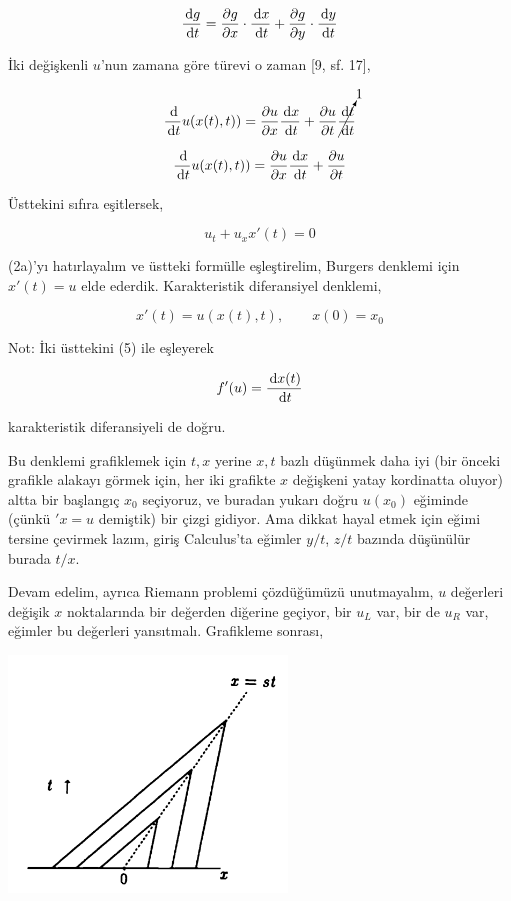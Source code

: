 \documentclass[12pt,fleqn]{article}\usepackage{../../common}
\begin{document}
$$
\frac{\,\mathrm{d} g}{\,\mathrm{d} t} =
\frac{\partial g}{\partial x} \cdot \frac{\,\mathrm{d} x}{\,\mathrm{d} t} +
\frac{\partial g}{\partial y} \cdot \frac{\,\mathrm{d} y}{\,\mathrm{d} t} 
$$

İki değişkenli $u$'nun zamana göre türevi o zaman [9, sf. 17],

$$
\frac{\,\mathrm{d}}{\,\mathrm{d} t} u (x(t),t)) =
\frac{\partial u}{\partial x} \frac{\,\mathrm{d} x}{\,\mathrm{d} t} +
\frac{\partial u}{\partial t} \cancelto{1}{\frac{\,\mathrm{d} t}{\,\mathrm{d} t}}
$$

$$
\frac{\,\mathrm{d}}{\,\mathrm{d} t} u (x(t),t)) =
\frac{\partial u}{\partial x} \frac{\,\mathrm{d} x}{\,\mathrm{d} t} +
\frac{\partial u}{\partial t}
$$

Üsttekini sıfıra eşitlersek, 

$$
u_t  + u_x x'(t) = 0
$$

(2a)'yı hatırlayalım ve üstteki formülle eşleştirelim, Burgers denklemi için
$x'(t) = u$ elde ederdik. Karakteristik diferansiyel denklemi,

$$
x'(t) = u(x(t),t), \qquad x(0) = x_0
$$

Not: İki üsttekini (5) ile eşleyerek

$$
f'(u) = \frac{\,\mathrm{d} x(t)}{\,\mathrm{d} t}
$$

karakteristik diferansiyeli de doğru.

Bu denklemi grafiklemek için $t,x$ yerine $x,t$ bazlı düşünmek daha iyi (bir
önceki grafikle alakayı görmek için, her iki grafikte $x$ değişkeni yatay
kordinatta oluyor) altta bir başlangıç $x_0$ seçiyoruz, ve buradan yukarı doğru
$u(x_0)$ eğiminde (çünkü $'x = u$ demiştik) bir çizgi gidiyor. Ama dikkat hayal
etmek için eğimi tersine çevirmek lazım, giriş Calculus'ta eğimler $y/t$, $z/t$
bazında düşünülür burada $t/x$.

Devam edelim, ayrıca Riemann problemi çözdüğümüzü unutmayalım, $u$ değerleri
değişik $x$ noktalarında bir değerden diğerine geçiyor, bir $u_L$ var, bir de
$u_R$ var, eğimler bu değerleri yansıtmalı. Grafikleme sonrası,

\includegraphics[width=20em]{compscieng_bpp50fv1_03.png}
\end{document}
